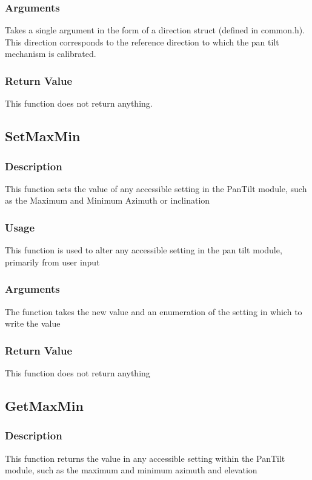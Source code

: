 \documentclass[]{report}
\begin{document}
\subsubsection{Arguments}
Takes a single argument in the form of a direction struct (defined in common.h). This direction corresponds to the reference direction to which the pan tilt mechanism is calibrated.

\subsubsection{Return Value}
This function does not return anything.

\subsection{SetMaxMin}
\subsubsection{Description}
This function sets the value of any accessible setting in the PanTilt module, such as the Maximum and Minimum Azimuth or inclination

\subsubsection{Usage}
This function is used to alter any accessible setting in the pan tilt module, primarily from user input

\subsubsection{Arguments}
The function takes the new value and an enumeration of the setting in which to write the value

\subsubsection{Return Value}
This function does not return anything

\subsection{GetMaxMin}
\subsubsection{Description}
This function returns the value in any accessible setting within the PanTilt module, such as the maximum and minimum azimuth and elevation
\end{document}
